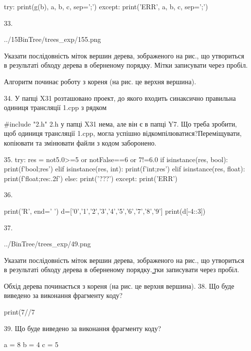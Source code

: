 \documentclass[11pt]{article}
\begin{document}
try:
    print(g(b), a, b, c, sep=';')
except:
    print('ERR', a, b, c, sep=';')

33. 

\begin{center}
	{../15BinTree/trees_exp/155.png}
\end{center}
Указати послідовність міток вершин дерева, зображеного на рис., що утвориться в результаті обходу дерева в оберненому порядку. Мітки записувати через пробіл.\par Алгоритм починає роботу з кореня (на рис. це верхня вершина).

34. 
У папці X31 розташовано проект, до якого входить синаксично правильна одиниця трансляції 1.cpp з рядком\par
{\#}include "2.h"
 2.h у папці X31 нема, але він є в папці Y7. Що треба зробити, щоб одиниця трансляції 1.cpp, могла успішно відкомпілюватися?Переміщувати, копіювати та змінювати файли з кодом заборонено.\par\vspace{1.5cm}
35. 
try:
    res = not5.0>=5 or notFalse==6 or 7!=6.0
    if isinstance(res, bool):
        print(f'bool;{res}')
    elif isinstance(res, int):
        print(f'int;{res}')
    elif isinstance(res, float):
        print(f'float;{res:.2f}')
    else:
        print('???')
except:
    print('ERR')

36. 

print('R', end=' ')
d=['0','1','2','3','4','5','6','7','8','9']
print(d[-4::3])


37. 

\begin{center}
	{../BinTree/trees_exp/49.png}
\end{center}
Указати послідовність міток вершин дерева, зображеного на рис., що утвориться в результаті обходу дерева в оберненому порядку. ̳тки записувати через пробіл.\par Обхід дерева починається з кореня (на рис. це верхня вершина).
38. Що буде виведено за виконання фрагменту коду?

print(7//7%

39. Що буде виведено за виконання фрагменту коду?

a = 8
b = 4
c = 5
\end{document}
